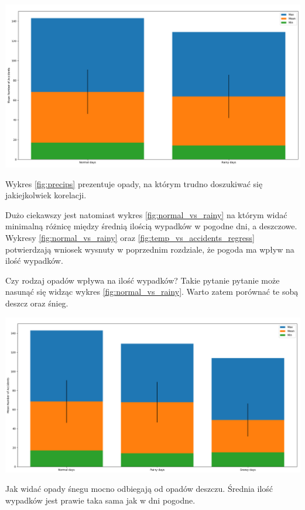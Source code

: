 \documentclass{article}
\begin{document}
 \begin{center}
    \includegraphics[scale=0.3]{visualization/normal_vs_rainy.png}
    \captionsetup{hypcap=false}
    \label{fig:normal_vs_rainy}
\end{center}

Wykres \ref{fig:precips} prezentuje opady, na którym trudno doszukiwać się jakiejkolwiek korelacji.

Dużo ciekawszy jest natomiast wykres \ref{fig:normal_vs_rainy} na którym widać minimalną różnicę między średnią ilością wypadków w pogodne dni, a deszczowe.
Wykresy \ref{fig:normal_vs_rainy} oraz \ref{fig:temp_vs_accidents_regress} potwierdzają wniosek wysnuty w poprzednim rozdziale, że pogoda ma wpływ na ilość wypadków.

Czy rodzaj opadów wpływa na ilość wypadków? Takie pytanie pytanie może nasunąć się widząc wykres \ref{fig:normal_vs_rainy}. Warto zatem porównać te sobą deszcz oraz śnieg.

 \begin{center}
    \includegraphics[scale=0.3]{visualization/rain_vs_snow.png}
    \captionsetup{hypcap=false}
    \label{fig:normal_vs_rainy_snow}
\end{center}
Jak widać opady śnegu mocno odbiegają od opadów deszczu. Średnia ilość wypadków jest prawie taka sama jak w dni pogodne. 
\end{document}
